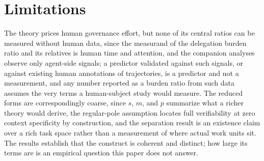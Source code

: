 \documentclass[10pt]{article}
\theoremstyle{remark}
\begin{document}
\section{Limitations}

The theory prices human governance effort, but none of its central ratios can be measured without human data, since the measurand of the delegation burden ratio and its relatives is human time and attention, and the companion analyses observe only agent-side signals; a predictor validated against such signals, or against existing human annotations of trajectories, is a predictor and not a measurement, and any number reported as a burden ratio from such data assumes the very terms a human-subject study would measure. The reduced forms are correspondingly coarse, since $s$, $m$, and $p$ summarize what a richer theory would derive, the regular-pole assumption locates full verifiability at zero context specificity by construction, and the separation result is an existence claim over a rich task space rather than a measurement of where actual work units sit. The results establish that the construct is coherent and distinct; how large its terms are is an empirical question this paper does not answer.
\end{document}
